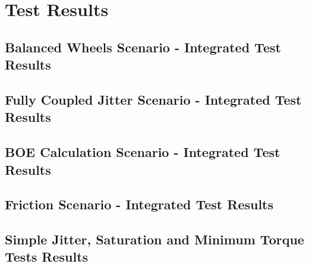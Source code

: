 \clearpage

\section{Test Results}

\subsection{Balanced Wheels Scenario - Integrated Test Results}






\clearpage

\subsection{Fully Coupled Jitter Scenario - Integrated Test Results}






\clearpage

\subsection{BOE Calculation Scenario - Integrated Test Results}





\clearpage

\subsection{Friction Scenario - Integrated Test Results}





\clearpage

\subsection{Simple Jitter, Saturation and Minimum Torque Tests Results}

